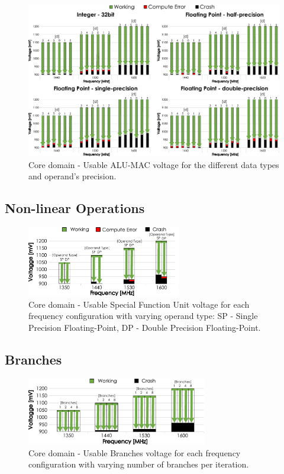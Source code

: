 \begin{figure}[htb]
  \centering
  \includegraphics[width=1\textwidth]{Figures/GPU_characterization/MAC_Guardband.pdf}
  \caption{Core domain - Usable ALU-MAC voltage for the different data types and operand's precision.}
  \label{fig:MAC_guardband}
\end{figure}

\subsection{Non-linear Operations}

\begin{figure}[htb]
  \centering
  \includegraphics[width=0.6\textwidth]{Figures/GPU_characterization/SFU_guardband.pdf}
  \caption{Core domain - Usable Special Function Unit voltage for each frequency configuration with varying operand type: SP - Single Precision Floating-Point, DP - Double Precision Floating-Point.}
  \label{fig:SFU_guardband}
\end{figure}

\subsection{Branches}

\begin{figure}[htb]
  \centering
  \includegraphics[width=0.7\textwidth]{Figures/GPU_characterization/Branches_guardband.pdf}
  \caption{Core domain - Usable Branches voltage for each frequency configuration with varying number of branches per iteration.}
  \label{fig:Branches_guardband}
\end{figure}

